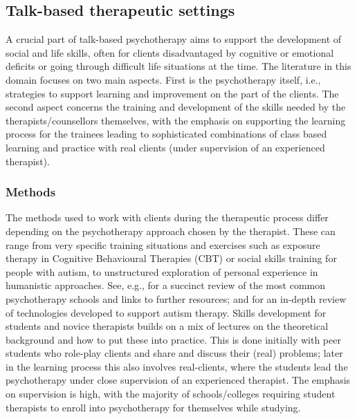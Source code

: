\documentclass[prodmode,acmtochi]{acmsmall}
\begin{document}
\subsection{Talk-based therapeutic settings}
A crucial part of talk-based psychotherapy aims to support the development of social and life skills, often for clients  disadvantaged by cognitive or emotional deficits or going through difficult life situations at the time. %
%
The literature in this domain focuses on two main aspects. First is the psychotherapy itself, i.e., strategies to support learning and improvement on the part of the clients. The second aspect concerns the training and development of the skills needed by the therapists/counsellors themselves, with the emphasis on supporting the learning process for the trainees leading to sophisticated combinations of class based learning and practice with real clients (under supervision of an experienced therapist). 



\subsubsection*{Methods}  
The methods used to work with clients during the therapeutic process differ depending on the psychotherapy approach chosen by the therapist. These can range from very specific training situations and exercises such as exposure therapy in Cognitive Behavioural Therapies (CBT) or social skills training for people with autism, to unstructured exploration of personal experience in humanistic approaches.  See, e.g.,  for a succinct review of the most common psychotherapy schools and links to further resources; and \cite{Kientz2013} for an in-depth review of technologies developed to support autism therapy. 
%
Skills development for students and novice therapists builds on a mix of lectures on the theoretical background and how to put these into practice. This is done initially with peer students who role-play clients and share and discuss their (real) problems; later in the learning process this also involves real-clients, where the students lead the psychotherapy under close supervision of an experienced therapist. The emphasis on supervision is high, with the majority of schools/colleges requiring student therapists to enroll into psychotherapy for themselves while studying. 
\end{document}
